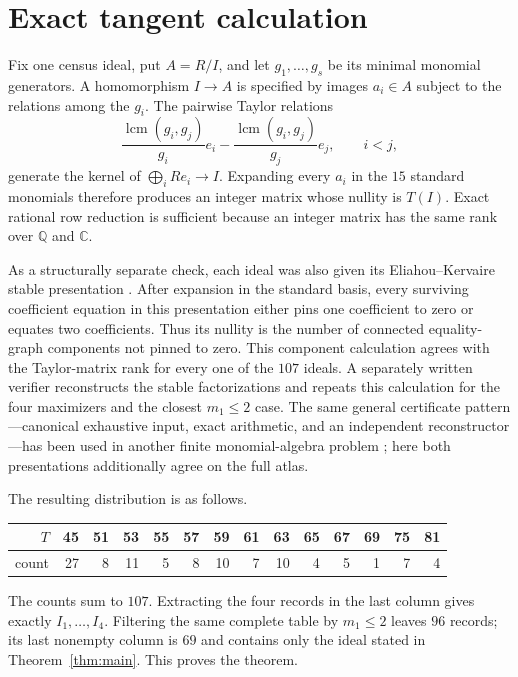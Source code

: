 \documentclass[11pt]{article}
\newcommand{\CC}{\mathbb C}
\begin{document}
\section{Exact tangent calculation}

Fix one census ideal, put $A=R/I$, and let $g_1,\ldots,g_s$ be its minimal
monomial generators.  A homomorphism $I\to A$ is specified by images
$a_i\in A$ subject to the relations among the $g_i$.  The pairwise Taylor
relations \cite{Taylor1966}
\[
 \frac{\operatorname{lcm}(g_i,g_j)}{g_i}e_i-
 \frac{\operatorname{lcm}(g_i,g_j)}{g_j}e_j,
 \qquad i<j,
\]
generate the kernel of $\bigoplus_i Re_i\to I$.  Expanding every $a_i$ in
the $15$ standard monomials therefore produces an integer matrix whose
nullity is $T(I)$.  Exact rational row reduction is sufficient because an
integer matrix has the same rank over $\mathbb Q$ and $\CC$.

As a structurally separate check, each ideal was also given its
Eliahou--Kervaire stable presentation \cite{EliahouKervaire1990}.  After
expansion in the standard basis, every surviving coefficient equation in
this presentation either pins one coefficient to zero or equates two
coefficients.  Thus its nullity is the number of connected equality-graph
components not pinned to zero.  This component calculation agrees with the
Taylor-matrix rank for every one of the $107$ ideals.  A separately written
verifier reconstructs the stable factorizations and repeats this calculation
for the four maximizers and the closest $m_1\leq2$ case.  The same general
certificate pattern---canonical exhaustive input, exact arithmetic, and an
independent reconstructor---has been used in another finite monomial-algebra
problem \cite{Zeng2026SSRN7385138}; here both presentations additionally agree on
the full atlas.

The resulting distribution is as follows.
\begin{center}
\small
\begin{tabular}{@{}rrrrrrrrrrrrrr@{}}
\toprule
$T$&45&51&53&55&57&59&61&63&65&67&69&75&81\\
\midrule
count&27&8&11&5&8&10&7&10&4&5&1&7&4\\
\bottomrule
\end{tabular}
\end{center}
The counts sum to $107$.  Extracting the four records in the last column
gives exactly $I_1,\ldots,I_4$.  Filtering the same complete table by
$m_1\leq2$ leaves $96$ records; its last nonempty column is $69$ and contains
only the ideal stated in Theorem~\ref{thm:main}.  This proves the theorem.
\end{document}
